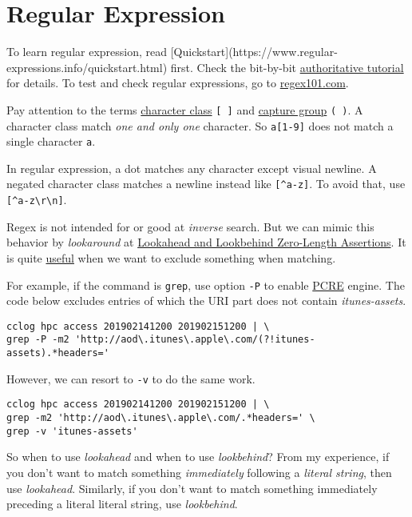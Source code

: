\chapter{Regular Expression}
\label{cha:regular-expression}

To learn regular expression, read
[Quickstart](https://www.regular-expressions.info/quickstart.html)
first. Check the bit-by-bit
\href{https://www.regular-expressions.info/tutorial.html}{authoritative
  tutorial} for details. To test and check regular expressions, go
to \href{https://regex101.com}{regex101.com}.

Pay attention to the terms \uline{character class} \lstinline|[ ]|
and \uline{capture group} \lstinline|( )|. A character class match
\textit{one and only one} character. So \lstinline|a[1-9]| does
not match a single character \verb|a|.

In regular expression, a dot matches any character except visual
newline. A negated character class matches a newline instead like
\lstinline|[^a-z]|.
To avoid that, use \lstinline|[^a-z\r\n]|.

Regex is not intended for or good at \textit{inverse} search. But
we can mimic this behavior by \textit{lookaround} at
\href{https://www.regular-expressions.info/lookaround.html}{Lookahead
  and Lookbehind Zero-Length Assertions}. It is quite
\href{https://stackoverflow.com/q/406230}{useful} when we want to
exclude something when matching.

For example, if the command is \lstinline|grep|, use option
\lstinline|-P| to enable \uline{PCRE} engine. The code below
excludes entries of which the URI part does not contain
\textit{itunes-assets}.

\begin{lstlisting}
cclog hpc access 201902141200 201902151200 | \
grep -P -m2 'http://aod\.itunes\.apple\.com/(?!itunes-assets).*headers='
\end{lstlisting}

However, we can resort to \lstinline|-v| to do the same work.

\begin{lstlisting}
cclog hpc access 201902141200 201902151200 | \
grep -m2 'http://aod\.itunes\.apple\.com/.*headers=' \
grep -v 'itunes-assets'
\end{lstlisting}

So when to use \textit{lookahead} and when to use
\textit{lookbehind}? From my experience, if you don't want
to match something \textit{immediately} following a
\textit{literal string}, then use \textit{lookahead}. Similarly,
if you don't want to match something immediately preceding a
literal literal string, use \textit{lookbehind}.


